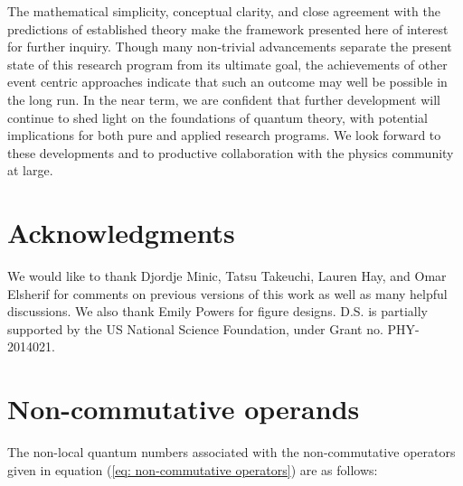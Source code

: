 \documentclass{article}
\begin{document}
The mathematical simplicity, conceptual clarity, and close agreement with the predictions of established theory make the framework presented here of interest for further inquiry. Though many non-trivial advancements separate the present state of this research program from its ultimate goal, the achievements of other event centric approaches indicate that such an outcome may well be possible in the long run. In the near term, we are confident that further development will continue to shed light on the foundations of quantum theory, with potential implications for both pure and applied research programs. We look forward to these developments and to productive collaboration with the physics community at large. 


\section*{Acknowledgments}
We would like to thank Djordje Minic, Tatsu Takeuchi, Lauren Hay, and Omar Elsherif for comments on previous versions of this work as well as many helpful discussions. We also thank Emily Powers for figure
designs. D.S. is partially supported by the US National Science Foundation, under Grant no. PHY-2014021. 



\appendix

\section{Non-commutative operands \label{sec: Non-commutative operands}}

The non-local quantum numbers associated with the non-commutative operators given in equation (\ref{eq: non-commutative operators}) are as follows: 
\end{document}
